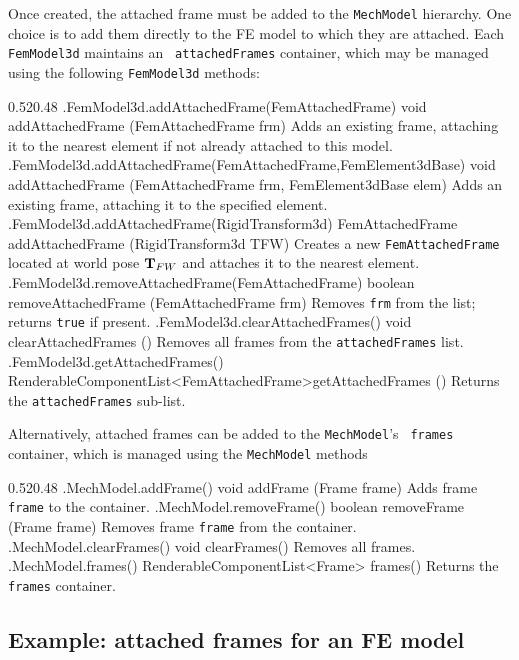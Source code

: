 Once created, the attached frame must be added to the {\tt MechModel}
hierarchy. One choice is to add them directly to the FE model to
which they are attached. Each {\tt FemModel3d} maintains an {\tt
attachedFrames} container, which may be managed using the
following {\tt FemModel3d} methods:
%
\begin{methodtable}[\smallskipamount]{0.52}{0.48}
\midline
%
\methodentry
{\fem.FemModel3d.addAttachedFrame(FemAttachedFrame)}%
{void addAttachedFrame (FemAttachedFrame frm)}%
{Adds an existing frame, attaching it to the nearest element if not
already attached to this model.}%
%
\methodentry
{\fem.FemModel3d.addAttachedFrame(FemAttachedFrame,FemElement3dBase)}%
{void addAttachedFrame (\brh FemAttachedFrame frm, FemElement3dBase elem)}%
{Adds an existing frame, attaching it to the specified element.}%
%
\methodentry
{\fem.FemModel3d.addAttachedFrame(RigidTransform3d)}%
{FemAttachedFrame addAttachedFrame (\brh RigidTransform3d TFW)}%
{Creates a new {\tt FemAttachedFrame} located at world pose ${\bf T}_{FW}$
and attaches it to the nearest element.}%
%
\methodentry
{\fem.FemModel3d.removeAttachedFrame(FemAttachedFrame)}%
{boolean removeAttachedFrame (FemAttachedFrame frm)}%
{Removes {\tt frm} from the list; returns {\tt true} if present.}%
%
\methodentry
{\fem.FemModel3d.clearAttachedFrames()}%
{void clearAttachedFrames ()}%
{Removes all frames from the {\tt attachedFrames} list.}%
%
\methodentry
{\fem.FemModel3d.getAttachedFrames()}%
{RenderableComponentList<FemAttachedFrame>\brh getAttachedFrames ()}%
{Returns the {\tt attachedFrames} sub-list.}%
%
\midline
\end{methodtable}
%

Alternatively, attached frames can be added to the {\tt MechModel}'s {\tt
frames} container, which is managed using the {\tt MechModel} methods
%
\begin{methodtable}{0.52}{0.48}
\midline
%
\methodentry
{\mech.MechModel.addFrame()}%
{void addFrame (Frame frame)}%
{Adds frame {\tt frame} to the container.}%
%
\methodentry
{\mech.MechModel.removeFrame()}%
{boolean removeFrame (Frame frame)}%
{Removes frame {\tt frame} from the container.}%
%
\methodentry
{\mech.MechModel.clearFrames()}%
{void clearFrames()}%
{Removes all frames.}%
%
\methodentry
{\mech.MechModel.frames()}%
{RenderableComponentList<Frame> frames()}%
{Returns the {\tt frames} container.}%
%
\midline
\end{methodtable}

\subsection{Example: attached frames for an FE model}
\label{FemAttachedFrames:sec}

